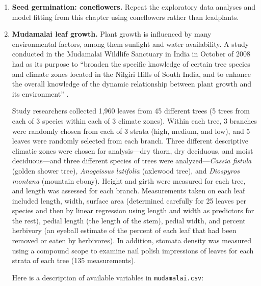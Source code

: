 \documentclass[
]{krantz}
\begin{document}
\begin{enumerate}
\def\labelenumi{\arabic{enumi}.}
\item
  \textbf{Seed germination: coneflowers.} Repeat the exploratory data analyses and model fitting from this chapter using coneflowers rather than leadplants.
\item
  \textbf{Mudamalai leaf growth.} Plant growth is influenced by many environmental factors, among them sunlight and water availability. A study conducted in the Mudamalai Wildlife Sanctuary in India in October of 2008 had as its purpose to ``broaden the specific knowledge of certain tree species and climate zones located in the Nilgiri Hills of South India, and to enhance the overall knowledge of the dynamic relationship between plant growth and its environment'' \citep{Pray2009}.

  Study researchers collected 1,960 leaves from 45 different trees (5 trees from each of 3 species within each of 3 climate zones). Within each tree, 3 branches were randomly chosen from each of 3 strata (high, medium, and low), and 5 leaves were randomly selected from each branch. Three different descriptive climatic zones were chosen for analysis---dry thorn, dry deciduous, and moist deciduous---and three different species of trees were analyzed---\emph{Cassia fistula} (golden shower tree), \emph{Anogeissus latifolia} (axlewood tree), and \emph{Diospyros montana} (mountain ebony). Height and girth were measured for each tree, and length was assessed for each branch. Measurements taken on each leaf included length, width, surface area (determined carefully for 25 leaves per species and then by linear regression using length and width as predictors for the rest), pedial length (the length of the stem), pedial width, and percent herbivory (an eyeball estimate of the percent of each leaf that had been removed or eaten by herbivores). In addition, stomata density was measured using a compound scope to examine nail polish impressions of leaves for each strata of each tree (135 measurements).

  Here is a description of available variables in \texttt{mudamalai.csv}:


\end{enumerate}
\end{document}
